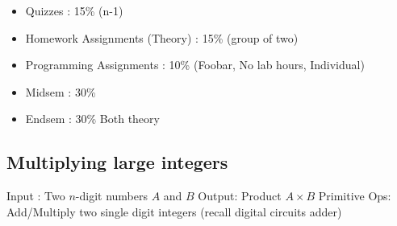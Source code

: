 \documentclass[a4paper
]{article}
\providecommand{\tightlist}{%
  \setlength{\itemsep}{0pt}\setlength{\parskip}{0pt}}
\begin{document}
\begin{itemize}
\tightlist
\item
  Quizzes : 15\% (n-1)
\item
  Homework Assignments (Theory) : 15\% (group of two)
\item
  Programming Assignments : 10\% (Foobar, No lab hours, Individual)
\item
  Midsem : 30\%
\item
  Endsem : 30\% Both theory
\end{itemize}

\hypertarget{multiplying-large-integers}{%
\subsection{Multiplying large
integers}\label{multiplying-large-integers}}

Input : Two {\(n\)}-digit numbers {\(A\)} and {\(B\)} Output: Product
{\(A \times B\)} Primitive Ops: Add/Multiply two single digit integers
(recall digital circuits adder)
\end{document}
